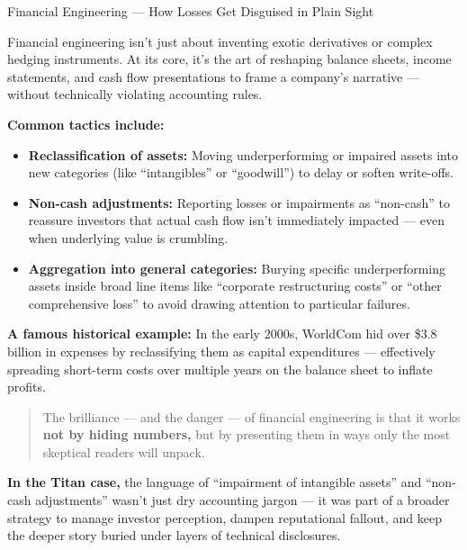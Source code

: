\begin{HistoricalSidebar}{Financial Engineering --- How Losses Get Disguised in Plain Sight}

    Financial engineering isn’t just about inventing exotic derivatives or complex hedging instruments.  
    At its core, it’s the art of reshaping balance sheets, income statements, and cash flow presentations to frame a company’s narrative — without technically violating accounting rules.
    
    \medskip
    
    \textbf{Common tactics include:}

    \medskip
    
    \begin{itemize}
        \item \textbf{Reclassification of assets:} Moving underperforming or impaired assets into new categories (like “intangibles” or “goodwill”) to delay or soften write-offs.
        
        \item \textbf{Non-cash adjustments:} Reporting losses or impairments as “non-cash” to reassure investors that actual cash flow isn’t immediately impacted — even when underlying value is crumbling.
        
        \item \textbf{Aggregation into general categories:} Burying specific underperforming assets inside broad line items like “corporate restructuring costs” or “other comprehensive loss” to avoid drawing attention to particular failures.
    \end{itemize}
    
    \medskip
    
    \textbf{A famous historical example:}  
    In the early 2000s, WorldCom hid over \$3.8 billion in expenses by reclassifying them as capital expenditures — effectively spreading short-term costs over multiple years on the balance sheet to inflate profits.
    
    \medskip
    
    \begin{quote}
        The brilliance — and the danger — of financial engineering is that it works  
        \textbf{not by hiding numbers,}  
        but by presenting them in ways only the most skeptical readers will unpack.
    \end{quote}
    
    \textbf{In the Titan case,} the language of “impairment of intangible assets” and “non-cash adjustments” wasn’t just dry accounting jargon —  
    it was part of a broader strategy to manage investor perception, dampen reputational fallout, and keep the deeper story buried under layers of technical disclosures.
    
\end{HistoricalSidebar}

